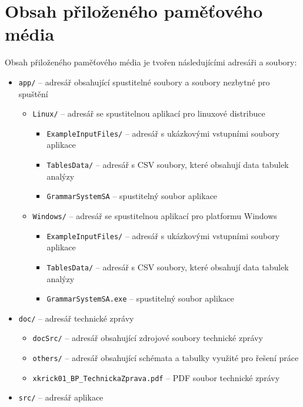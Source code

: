 \chapter{Obsah přiloženého paměťového média} \label{priloha:ObsahPametovehoMedia}
Obsah přiloženého paměťového média je tvořen následujícími adresáři a soubory:
\begin{itemize}
    \item \verb|app/| -- adresář obsahující spustitelné soubory a soubory nezbytné pro spuštění
    \begin{itemize}
        \item \verb|Linux/| -- adresář se spustitelnou aplikací pro linuxové distribuce
        \begin{itemize}[label=$\circ$]
            \item \verb|ExampleInputFiles/| -- adresář s ukázkovými vstupními soubory aplikace
            \item \texttt{TablesData/} -- adresář s CSV soubory, které obsahují data tabulek analýzy
            \item \verb|GrammarSystemSA| -- spustitelný soubor aplikace
        \end{itemize}
        \item \verb|Windows/| -- adresář se spustitelnou aplikací pro platformu Windows
        \begin{itemize}[label=$\circ$]
            \item \verb|ExampleInputFiles/| -- adresář s ukázkovými vstupními soubory aplikace
            \item \texttt{TablesData/} -- adresář s CSV soubory, které obsahují data tabulek analýzy
            \item \verb|GrammarSystemSA.exe| -- spustitelný soubor aplikace
        \end{itemize}
    \end{itemize}
    \item \verb|doc/| -- adresář technické zprávy
    \begin{itemize}
        \item \verb|docSrc/| -- adresář obsahující zdrojové soubory technické zprávy
        \item \verb|others/| -- adresář obsahující schémata a tabulky využité pro řešení práce
        \item \verb|xkrick01_BP_TechnickaZprava.pdf| -- PDF soubor technické zprávy
    \end{itemize}
    \item \verb|src/| -- adresář aplikace

\end{itemize}
